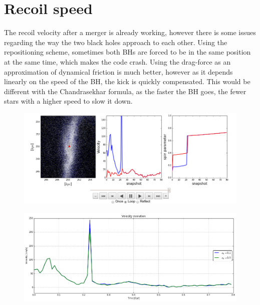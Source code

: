 \documentclass[a4,useAMS,usenatbib,usegraphicx,12pt]{article}
\begin{document}
\section{Recoil speed}
The recoil velocity after a merger is already working, however there is some issues regarding the
way the two black holes approach to each other. Using the repositioning scheme, sometimes both
BHs are forced to be in the same position at the same time, which makes the code crash. Using the 
drag-force as an approximation of dynamical friction is much better, however as it depends linearly
on the speed of the BH, the kick is quickly compensated. This would be different with the Chandrasekhar
formula, as the faster the BH goes, the fewer stars with a higher speed to slow it down.

\begin{figure}[htbp]
\centering
\includegraphics[width=1.\textwidth]{./figures/VideoRecoil.png}
\end{figure}

\begin{figure}[htbp]
\centering
\includegraphics[width=.9\textwidth]{./figures/RecoilSpins.png}
\end{figure}
\end{document}
